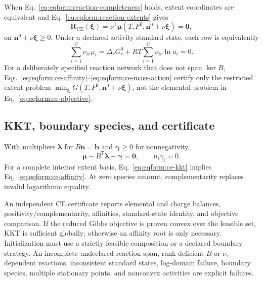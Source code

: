\documentclass[11pt]{article}
\begin{document}
When Eq.~\eqref{eq:eqform:reaction-completeness} holds, extent coordinates are
equivalent and Eq.~\eqref{eq:eqform:reaction-extents} gives
\begin{equation}
 \boldsymbol R_{\mathrm{CE}}(\boldsymbol\xi)
 =\nu^\mathsf T\boldsymbol\mu
 (T,P^0,\boldsymbol n^0+\nu\boldsymbol\xi)
 =\boldsymbol0,
\label{eq:eqform:ce-affinity}
\end{equation}
on \(\boldsymbol n^0+\nu\boldsymbol\xi\geq0\). Under a declared activity
standard state, each row is equivalently
\begin{equation}
 \sum_{i=1}^{C}\nu_{ir}\mu_i
 =\Delta_r G_r^0+RT\sum_{i=1}^{C}\nu_{ir}\ln a_i=0.
\label{eq:eqform:ce-mass-action}
\end{equation}
For a deliberately specified reaction network that does not span \(\ker B\),
Eqs.~\eqref{eq:eqform:ce-affinity}--\eqref{eq:eqform:ce-mass-action} certify
only the restricted extent problem
\(\min_{\boldsymbol\xi}G(T,P^0,\boldsymbol n^0+\nu\boldsymbol\xi)\), not the
elemental problem in Eq.~\eqref{eq:eqform:ce-objective}.

\subsection{KKT, boundary species, and certificate}

With multipliers \(\boldsymbol\lambda\) for \(B\boldsymbol n=\boldsymbol b\)
and \(\boldsymbol\gamma\geq0\) for nonnegativity,
\begin{equation}
 \boldsymbol\mu-B^\mathsf T\boldsymbol\lambda-\boldsymbol\gamma
 =\boldsymbol0,\qquad
 n_i\gamma_i=0.
\label{eq:eqform:ce-kkt}
\end{equation}
For a complete interior extent basis, Eq.~\eqref{eq:eqform:ce-kkt} implies
Eq.~\eqref{eq:eqform:ce-affinity}. At zero species amount, complementarity
replaces invalid logarithmic equality.

An independent CE certificate reports elemental and charge balances,
positivity/complementarity, affinities, standard-state identity, and objective
comparison. If the reduced Gibbs objective is proven convex over the feasible
set, KKT is sufficient globally; otherwise an affinity root is only necessary.
Initialization must use a strictly feasible composition or a declared boundary
strategy. An incomplete undeclared reaction span, rank-deficient \(B\) or
\(\nu\), dependent reactions, inconsistent
standard states, log-domain failure, boundary species, multiple stationary
points, and nonconvex activities are explicit failures.
\end{document}
